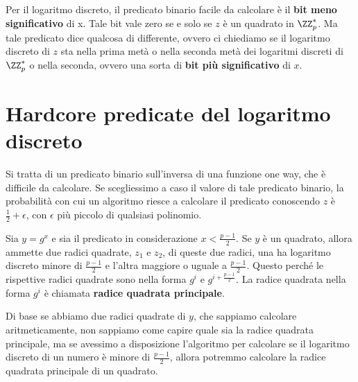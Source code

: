 Per il logaritmo discreto, il predicato binario facile da calcolare è il \textbf{bit 
meno significativo} di x. Tale bit vale zero se e solo se $z$ è un quadrato in $\ZZ_p^*$.
Ma tale predicato dice qualcosa di differente, ovvero ci chiediamo se il logaritmo discreto di 
$z$ sta nella prima metà o nella seconda metà dei logaritmi discreti di $\ZZ_p^*$ o nella seconda,
ovvero una sorta di \textbf{bit più significativo} di $x$.
\section{Hardcore predicate del logaritmo discreto}
\begin{tcolorbox}[title = Hardcore predicate]
  Si tratta di un predicato binario sull'inversa di una funzione one way, che è difficile da
  calcolare. Se scegliessimo a caso il valore di tale predicato binario, la 
  probabilità con cui un algoritmo riesce a calcolare il predicato conoscendo 
  $z$ è $\frac{1}{2} + \epsilon$, con $\epsilon$ più piccolo di qualsiasi 
  polinomio.
\end{tcolorbox}
Sia $y = g^x$ e sia il predicato in considerazione $x < \frac{p - 1}{2}$. Se 
  $y$ è un quadrato, allora ammette due radici quadrate, $z_1$ e $z_2$,
  di queste due radici, una ha logaritmo discreto minore di $\frac{p-1}{2}$ e l'altra
  maggiore o uguale a $\frac{p-1}{2}$. Questo perché le rispettive radici quadrate
  sono nella forma $g^{i}$ e $g^{i + \frac{p-1}{2}}$. La radice quadrata 
  nella forma $g^{i}$ è chiamata \textbf{radice quadrata principale}.

  Di base se abbiamo due radici quadrate di $y$, che sappiamo 
  calcolare aritmeticamente, non sappiamo come capire quale sia
  la radice quadrata principale, ma se 
  avessimo a disposizione l'algoritmo per calcolare se il logaritmo 
  discreto di un numero è minore di $\frac{p-1}{2}$, allora potremmo
  calcolare la radice quadrata principale di un quadrato.


